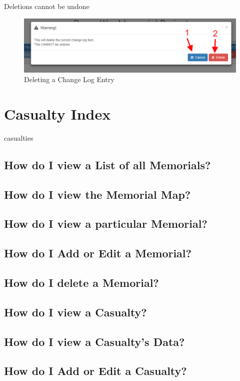 \documentclass[12pt]{article}
\begin{document}
\begin{warningBox}
Deletions cannot be undone
\end{warningBox}

\begin{figure}[h]
  \centering
 \includegraphics[width=.9\textwidth]{pics/delete_change.png}
	\caption{Deleting a Change Log Entry}\label{fig:delete_change}
\end{figure}

\newpage
\FloatBarrier
\section{Casualty Index}\label{sec:casualtyIndex}
casualties
\subsection{How do I view a List of all Memorials?}
\subsection{How do I view the Memorial Map?}
\subsection{How do I view a particular Memorial?}
\subsection{How do I Add or Edit a Memorial?}
\subsection{How do I delete a Memorial?}
\subsection{How do I view a Casualty?}
\subsection{How do I view a Casualty's Data?}
\subsection{How do I Add or Edit a Casualty?}
\end{document}
